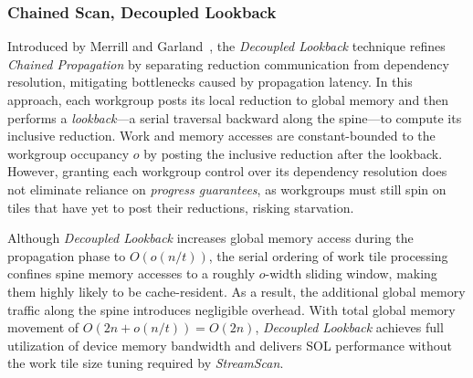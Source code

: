 \documentclass[sigconf,screen]{acmart}
\begin{document}
\subsubsection{Chained Scan, Decoupled Lookback}
Introduced by Merrill and Garland~\cite{Merrill2016}, the \emph{Decoupled Lookback} technique refines \emph{Chained Propagation} by separating reduction communication from dependency resolution, mitigating bottlenecks caused by propagation latency. In this approach, each workgroup posts its local reduction to global memory and then performs a \emph{lookback}---a serial traversal backward along the spine---to compute its inclusive reduction. Work and memory accesses are constant-bounded to the workgroup occupancy $o$ by posting the inclusive reduction after the lookback. However, granting each workgroup control over its dependency resolution does not eliminate reliance on \emph{progress guarantees}, as workgroups must still spin on tiles that have yet to post their reductions, risking starvation.

Although \emph{Decoupled Lookback} increases global memory access during the propagation phase to $O(o(n/t))$, the serial ordering of work tile processing confines spine memory accesses to a roughly $o$-width sliding window, making them highly likely to be cache-resident. As a result, the additional global memory traffic along the spine introduces negligible overhead. With total global memory movement of $O(2n+o(n/t))= O(2n)$, \emph{Decoupled Lookback} achieves full utilization of device memory bandwidth and delivers SOL performance without the work tile size tuning required by \emph{StreamScan}.
\end{document}
